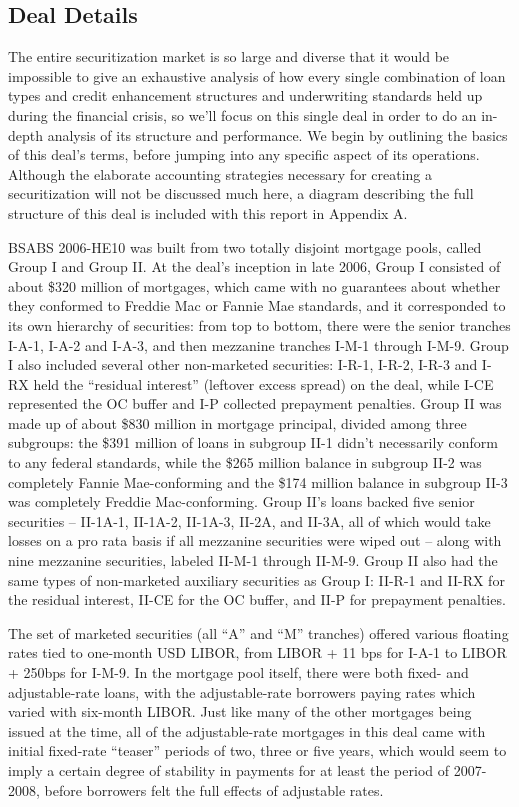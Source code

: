 \documentclass[12pt]{article}
\begin{document}
\subsection*{Deal Details}

The entire securitization market is so large and diverse that it would be impossible to give an exhaustive analysis of how every single combination of loan types and credit enhancement structures and underwriting standards held up during the financial crisis, so we’ll focus on this single deal in order to do an in-depth analysis of its structure and performance. We begin by outlining the basics of this deal’s terms, before jumping into any specific aspect of its operations. Although the elaborate accounting strategies necessary for creating a securitization will not be discussed much here, a diagram describing the full structure of this deal is included with this report in Appendix A.

BSABS 2006-HE10 was built from two totally disjoint mortgage pools, called Group I and Group II. At the deal’s inception in late 2006, Group I consisted of about \$320 million of mortgages, which came with no guarantees about whether they conformed to Freddie Mac or Fannie Mae standards, and it corresponded to its own hierarchy of securities: from top to bottom, there were the senior tranches I-A-1, I-A-2 and I-A-3, and then mezzanine tranches I-M-1 through I-M-9. Group I also included several other non-marketed securities: I-R-1, I-R-2, I-R-3 and I-RX held the “residual interest” (leftover excess spread) on the deal, while I-CE represented the OC buffer and I-P collected prepayment penalties. Group II was made up of about \$830 million in mortgage principal, divided among three subgroups: the \$391 million of loans in subgroup II-1 didn’t necessarily conform to any federal standards, while the \$265 million balance in subgroup II-2 was completely Fannie Mae-conforming and the \$174 million balance in subgroup II-3 was completely Freddie Mac-conforming. Group II’s loans backed five senior securities – II-1A-1, II-1A-2, II-1A-3, II-2A, and II-3A, all of which would take losses on a pro rata basis if all mezzanine securities were wiped out – along with nine mezzanine securities, labeled II-M-1 through II-M-9. Group II also had the same types of non-marketed auxiliary securities as Group I: II-R-1 and II-RX for the residual interest, II-CE for the OC buffer, and II-P for prepayment penalties.

The set of marketed securities (all “A” and “M” tranches) offered various floating rates tied to one-month USD LIBOR, from LIBOR + 11 bps for I-A-1 to LIBOR + 250bps for I-M-9. In the mortgage pool itself, there were both fixed- and adjustable-rate loans, with the adjustable-rate borrowers paying rates which varied with six-month LIBOR. Just like many of the other mortgages being issued at the time, all of the adjustable-rate mortgages in this deal came with initial fixed-rate “teaser” periods of two, three or five years, which would seem to imply a certain degree of stability in payments for at least the period of 2007-2008, before borrowers felt the full effects of adjustable rates.
\end{document}
